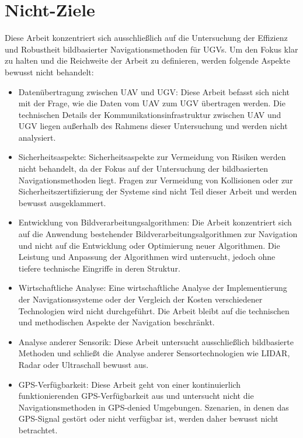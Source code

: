 \section{Nicht-Ziele}

Diese Arbeit konzentriert sich ausschließlich auf die Untersuchung der Effizienz und Robustheit bildbasierter Navigationsmethoden für \ac{UGV}s. 
Um den Fokus klar zu halten und die Reichweite der Arbeit zu definieren, werden folgende Aspekte bewusst nicht behandelt:

\begin{itemize}
  \item Datenübertragung zwischen \ac{UAV} und \ac{UGV}: 
    Diese Arbeit befasst sich nicht mit der Frage, wie die Daten vom \ac{UAV} zum \ac{UGV} übertragen werden. 
    Die technischen Details der Kommunikationsinfrastruktur zwischen \ac{UAV} und \ac{UGV} liegen außerhalb des Rahmens dieser Untersuchung und werden nicht analysiert.

  \item Sicherheitsaspekte: 
    Sicherheitsaspekte zur Vermeidung von Risiken werden nicht behandelt, da der Fokus auf der Untersuchung der bildbasierten Navigationsmethoden liegt. 
    Fragen zur Vermeidung von Kollisionen oder zur Sicherheitszertifizierung der Systeme sind nicht Teil dieser Arbeit und werden bewusst ausgeklammert.

  \item Entwicklung von Bildverarbeitungsalgorithmen: 
    Die Arbeit konzentriert sich auf die Anwendung bestehender Bildverarbeitungsalgorithmen zur Navigation und nicht auf die Entwicklung oder Optimierung neuer Algorithmen. 
    Die Leistung und Anpassung der Algorithmen wird untersucht, jedoch ohne tiefere technische Eingriffe in deren Struktur.

  \item Wirtschaftliche Analyse: 
    Eine wirtschaftliche Analyse der Implementierung der Navigationssysteme oder der Vergleich der Kosten verschiedener Technologien wird nicht durchgeführt. 
    Die Arbeit bleibt auf die technischen und methodischen Aspekte der Navigation beschränkt.

  \item Analyse anderer Sensorik: 
    Diese Arbeit untersucht ausschließlich bildbasierte Methoden und schließt die Analyse anderer Sensortechnologien wie \gls{LIDAR}, Radar oder Ultraschall bewusst aus.

  \item GPS-Verfügbarkeit: 
    Diese Arbeit geht von einer kontinuierlich funktionierenden \ac{GPS}-Verfügbarkeit aus und untersucht nicht die Navigationsmethoden in \gls{GPS-denied} Umgebungen. 
    Szenarien, in denen das \ac{GPS}-Signal gestört oder nicht verfügbar ist, werden daher bewusst nicht betrachtet.
\end{itemize}

